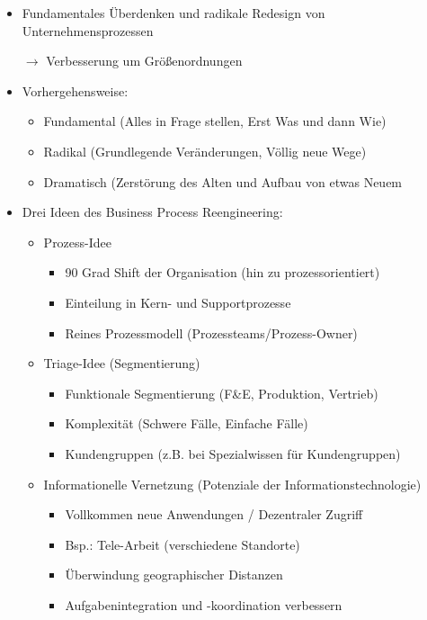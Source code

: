 \begin{itemize}
\item Fundamentales Überdenken und radikale Redesign von Unternehmensprozessen
\item[$\rightarrow$] Verbesserung um Größenordnungen
\item Vorhergehensweise:
	\begin{itemize}
	\item Fundamental (Alles in Frage stellen, Erst Was und dann Wie)
	\item Radikal (Grundlegende Veränderungen, Völlig neue Wege)
	\item Dramatisch (Zerstörung des Alten und Aufbau von etwas Neuem
	\end{itemize}
\item Drei Ideen des Business Process Reengineering:
	\begin{itemize}
	\item Prozess-Idee
		\begin{itemize}
		\item 90 Grad Shift der Organisation (hin zu prozessorientiert)
		\item Einteilung in Kern- und Supportprozesse
		\item Reines Prozessmodell (Prozessteams/Prozess-Owner)
		\end{itemize}
		
	\item Triage-Idee (Segmentierung)	
		\begin{itemize}
		\item Funktionale Segmentierung (F\&E, Produktion, Vertrieb)
		\item Komplexität (Schwere Fälle, Einfache Fälle)
		\item Kundengruppen (z.B. bei Spezialwissen für Kundengruppen)
		\end{itemize}
		
	\item Informationelle Vernetzung (Potenziale der Informationstechnologie)
		\begin{itemize}
		\item Vollkommen neue Anwendungen / Dezentraler Zugriff
		\item Bsp.: Tele-Arbeit (verschiedene Standorte)
		\item Überwindung geographischer Distanzen
		\item Aufgabenintegration und -koordination verbessern
		\end{itemize}
	\end{itemize}
	

\end{itemize}
